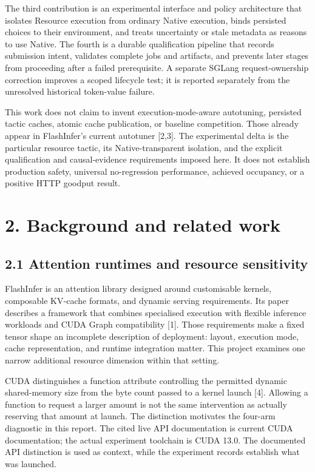 \documentclass[11pt,a4paper]{article}
\begin{document}
The third contribution is an experimental interface and policy architecture that isolates Resource execution from ordinary Native execution, binds persisted choices to their environment, and treats uncertainty or stale metadata as reasons to use Native. The fourth is a durable qualification pipeline that records submission intent, validates complete jobs and artifacts, and prevents later stages from proceeding after a failed prerequisite. A separate SGLang request-ownership correction improves a scoped lifecycle test; it is reported separately from the unresolved historical token-value failure.


This work does not claim to invent execution-mode-aware autotuning, persisted tactic caches, atomic cache publication, or baseline competition. Those already appear in FlashInfer's current autotuner [2,3]. The experimental delta is the particular resource tactic, its Native-transparent isolation, and the explicit qualification and causal-evidence requirements imposed here. It does not establish production safety, universal no-regression performance, achieved occupancy, or a positive HTTP goodput result.


\clearpage

\section*{2. Background and related work}


\subsection*{2.1 Attention runtimes and resource sensitivity}

FlashInfer is an attention library designed around customisable kernels, composable KV-cache formats, and dynamic serving requirements. Its paper describes a framework that combines specialised execution with flexible inference workloads and CUDA Graph compatibility [1]. Those requirements make a fixed tensor shape an incomplete description of deployment: layout, execution mode, cache representation, and runtime integration matter. This project examines one narrow additional resource dimension within that setting.


CUDA distinguishes a function attribute controlling the permitted dynamic shared-memory size from the byte count passed to a kernel launch [4]. Allowing a function to request a larger amount is not the same intervention as actually reserving that amount at launch. The distinction motivates the four-arm diagnostic in this report. The cited live API documentation is current CUDA documentation; the actual experiment toolchain is CUDA 13.0. The documented API distinction is used as context, while the experiment records establish what was launched.
\end{document}
